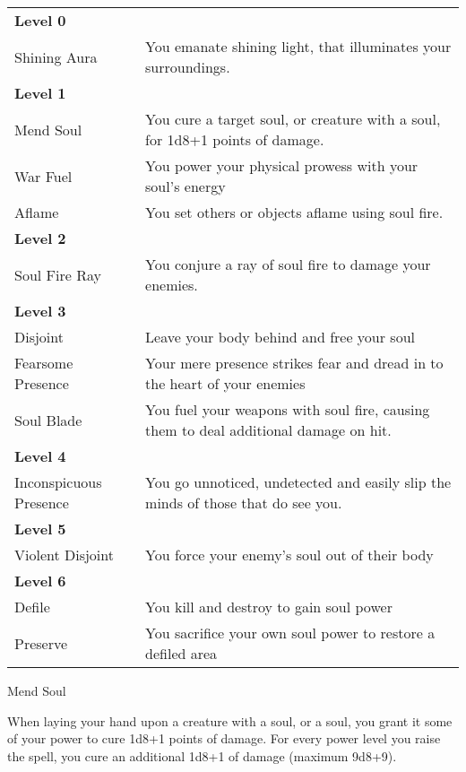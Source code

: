 \begin{table*}[!htb]
  \caption{Soul Powers}
  \begin{tabular}{p{4cm} p{11cm}}
    \textbf{Level 0} & \nobreak \\
    Shining Aura     & You emanate shining light, that illuminates your surroundings. \\
    \textbf{Level 1} & \nobreak \\
    Mend Soul        & You cure a target soul, or creature with a soul, for 1d8+1 points of damage. \\
    War Fuel         & You power your physical prowess with your soul's energy \\
    Aflame           & You set others or objects aflame using soul fire. \\
    \textbf{Level 2} & \nobreak \\
    Soul Fire Ray    & You conjure a ray of soul fire to damage your enemies. \\
    \textbf{Level 3} & \nobreak \\
    Disjoint         & Leave your body behind and free your soul \\
    Fearsome Presence& Your mere presence strikes fear and dread in to the heart of your enemies \\
    Soul Blade       & You fuel your weapons with soul fire, causing them to deal additional damage on hit. \\
    \textbf{Level 4} & \nobreak \\
    Inconspicuous Presence & You go unnoticed, undetected and easily slip the minds of those that do see you. \\
    \textbf{Level 5} & \nobreak \\
    Violent Disjoint & You force your enemy's soul out of their body \\
    \textbf{Level 6} & \nobreak \\
    Defile           & You kill and destroy to gain soul power \\
    Preserve         & You sacrifice your own soul power to restore a defiled area \\
  \end{tabular}
\end{table*}

\begin{soulpower}{Mend Soul}
  \rangetouch
  \instantaneous

  When laying your hand upon a creature with a soul, or a soul, you grant it
  some of your power to cure 1d8+1 points of damage. For every power level you
  raise the spell, you cure an additional 1d8+1 of damage (maximum 9d8+9).
\end{soulpower}

